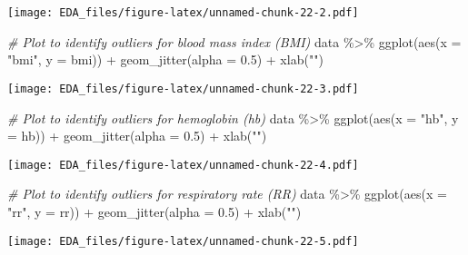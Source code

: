 \documentclass[
]{article}
\newenvironment{Shaded}{\begin{snugshade}}{\end{snugshade}}
\newcommand{\AttributeTok}[1]{\textcolor[rgb]{0.77,0.63,0.00}{#1}}
\newcommand{\CommentTok}[1]{\textcolor[rgb]{0.56,0.35,0.01}{\textit{#1}}}
\newcommand{\FloatTok}[1]{\textcolor[rgb]{0.00,0.00,0.81}{#1}}
\newcommand{\FunctionTok}[1]{\textcolor[rgb]{0.00,0.00,0.00}{#1}}
\newcommand{\NormalTok}[1]{#1}
\newcommand{\SpecialCharTok}[1]{\textcolor[rgb]{0.00,0.00,0.00}{#1}}
\newcommand{\StringTok}[1]{\textcolor[rgb]{0.31,0.60,0.02}{#1}}
\begin{document}
\texttt{[image: EDA\_files/figure-latex/unnamed-chunk-22-2.pdf]}

\begin{Shaded}
\begin{Highlighting}[]
\CommentTok{\# Plot to identify outliers for blood mass index (BMI)}
\NormalTok{data }\SpecialCharTok{\%\textgreater{}\%} 
  \FunctionTok{ggplot}\NormalTok{(}\FunctionTok{aes}\NormalTok{(}\AttributeTok{x =} \StringTok{"bmi"}\NormalTok{, }\AttributeTok{y =}\NormalTok{ bmi)) }\SpecialCharTok{+}
  \FunctionTok{geom\_jitter}\NormalTok{(}\AttributeTok{alpha =} \FloatTok{0.5}\NormalTok{) }\SpecialCharTok{+}
  \FunctionTok{xlab}\NormalTok{(}\StringTok{""}\NormalTok{)}
\end{Highlighting}
\end{Shaded}

\texttt{[image: EDA\_files/figure-latex/unnamed-chunk-22-3.pdf]}

\begin{Shaded}
\begin{Highlighting}[]
\CommentTok{\# Plot to identify outliers for hemoglobin (hb)}
\NormalTok{data }\SpecialCharTok{\%\textgreater{}\%} 
  \FunctionTok{ggplot}\NormalTok{(}\FunctionTok{aes}\NormalTok{(}\AttributeTok{x =} \StringTok{"hb"}\NormalTok{, }\AttributeTok{y =}\NormalTok{ hb)) }\SpecialCharTok{+}
  \FunctionTok{geom\_jitter}\NormalTok{(}\AttributeTok{alpha =} \FloatTok{0.5}\NormalTok{) }\SpecialCharTok{+}
  \FunctionTok{xlab}\NormalTok{(}\StringTok{""}\NormalTok{)}
\end{Highlighting}
\end{Shaded}

\texttt{[image: EDA\_files/figure-latex/unnamed-chunk-22-4.pdf]}

\begin{Shaded}
\begin{Highlighting}[]
\CommentTok{\# Plot to identify outliers for respiratory rate (RR)}
\NormalTok{data }\SpecialCharTok{\%\textgreater{}\%} 
  \FunctionTok{ggplot}\NormalTok{(}\FunctionTok{aes}\NormalTok{(}\AttributeTok{x =} \StringTok{"rr"}\NormalTok{, }\AttributeTok{y =}\NormalTok{ rr)) }\SpecialCharTok{+}
  \FunctionTok{geom\_jitter}\NormalTok{(}\AttributeTok{alpha =} \FloatTok{0.5}\NormalTok{) }\SpecialCharTok{+}
  \FunctionTok{xlab}\NormalTok{(}\StringTok{""}\NormalTok{)}
\end{Highlighting}
\end{Shaded}

\texttt{[image: EDA\_files/figure-latex/unnamed-chunk-22-5.pdf]}
\end{document}
